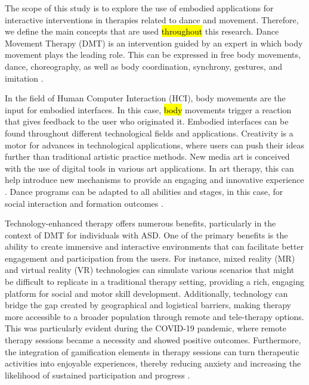 \documentclass[a4paper,fleqn]{cas-sc}
\begin{document}
The scope of this study is to explore the use of embodied applications for interactive interventions in therapies related to dance and movement. Therefore, we define the main concepts that are used \hl{throughout} this research.
Dance Movement Therapy (DMT) is an intervention guided by an expert in which body movement plays the leading role. This can be expressed in free body movements, dance, choreography, as well as body coordination, synchrony, gestures, and imitation \cite{Sheets10}.


In the field of Human Computer Interaction (HCI), body movements are the input for embodied interfaces. In this case, \hl{body} movements trigger a reaction that gives feedback to the user who originated it. Embodied interfaces can be found throughout different technological fields and applications. Creativity is a motor for advances in technological applications, where users can push their ideas further than traditional artistic practice methods. New media art is conceived with the use of digital tools in various art applications. In art therapy, this can help introduce new mechanisms to provide an engaging and innovative experience \cite{Papadopoulou2016}.  Dance programs can be adapted to all abilities and stages, in this case, for social interaction and formation outcomes 
\cite{Reinders19}.


Technology-enhanced therapy offers numerous benefits, particularly in the context of DMT for individuals with ASD. One of the primary benefits is the ability to create immersive and interactive environments that can facilitate better engagement and participation from the users. For instance, mixed reality (MR) and virtual reality (VR) technologies can simulate various scenarios that might be difficult to replicate in a traditional therapy setting, providing a rich, engaging platform for social and motor skill development. Additionally, technology can bridge the gap created by geographical and logistical barriers, making therapy more accessible to a broader population through remote and tele-therapy options. This was particularly evident during the COVID-19 pandemic, where remote therapy sessions became a necessity and showed positive outcomes. Furthermore, the integration of gamification elements in therapy sessions can turn therapeutic activities into enjoyable experiences, thereby reducing anxiety and increasing the likelihood of sustained participation and progress \cite{Parsons2011, Zhang2022}.
\end{document}
